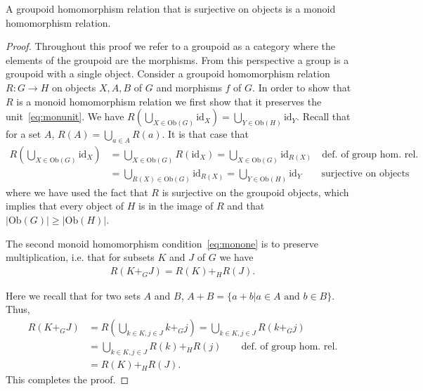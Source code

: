 \begin{lemma}
\label{lem:mongrphom}
A groupoid homomorphism relation that is surjective on objects is a monoid homomorphism relation.
\end{lemma}
\begin{proof}
Throughout this proof we refer to a groupoid as a category where the elements of the groupoid are the morphisms.  From this perspective a group is a groupoid with a single object. Consider a groupoid homomorphism relation $R:G\to H$ on objects $X,A,B$ of $G$ and morphisms $f$ of $G$.
In order to show that $R$ is a monoid homomorphism relation we first show that it preserves the unit~\eqref{eq:monunit}. We have $R(\bigcup_{X\in\mbox{Ob}(G)} \mbox{id}_X) = \bigcup_{Y\in\mbox{Ob}(H)} \mbox{id}_Y$. Recall that for a set $A$,  $R(A)=\bigcup_{a\in A} R(a)$. It is that case that
\begin{align}
R(\bigcup\nolimits_{X\in\mbox{Ob}(G)} \mbox{id}_X) &= \bigcup\nolimits_{X\in\mbox{Ob}(G)}R(\mbox{id}_X) = \bigcup\nolimits_{X\in\mbox{Ob}(G)}\mbox{id}_{R(X)} \quad \mbox{def. of group hom. rel.} \\
&= \bigcup\nolimits_{R(X)\in\mbox{Ob}(G)}\mbox{id}_{R(X)} = \bigcup\nolimits_{{Y\in\mbox{Ob}(H)}}\mbox{id}_{Y} \qquad \mbox{surjective on objects}
\end{align}
where we have used the fact that $R$ is surjective on the groupoid objects, which implies that every object of $H$ is in the image of $R$ and that $|\mbox{Ob}(G)|\ge|\mbox{Ob}(H)|$.

The second monoid homomorphism condition~\eqref{eq:monone} is to preserve multiplication, i.e. that for subsets $K$ and $J$ of $G$ we have
\begin{align}
R(K+_GJ)=R(K)+_HR(J).
\end{align}

\noindent Here we recall that for two sets $A$ and $B$, $A+B=\{a + b | a \in A\mbox{ and } b \in B\}$. Thus,
\begin{align}
R(K+_GJ) &= R(\bigcup\nolimits_{k\in K,j\in J}k+_Gj) = \bigcup\nolimits_{k\in K,j\in J}R(k+_Gj) \\
&= \bigcup\nolimits_{k\in K,j\in J}R(k)+_HR(j) \qquad \mbox{def. of group hom. rel.}\\
&= R(K)+_HR(J).
\end{align}
This completes the proof.
\end{proof}

